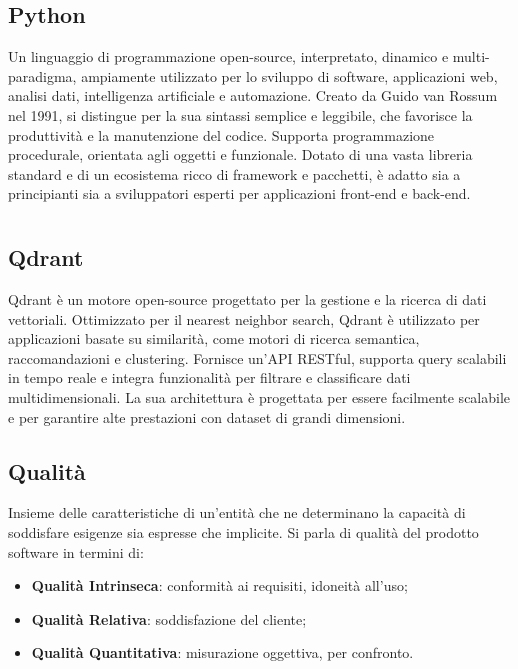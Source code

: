 \hypertarget{sec:python}{}
\subsection*{Python}
Un linguaggio di programmazione open-source, interpretato, dinamico e multi-paradigma, ampiamente utilizzato per lo sviluppo di software, applicazioni web, 
analisi dati, intelligenza artificiale e automazione. Creato da Guido van Rossum nel 1991, si distingue per la sua sintassi semplice e leggibile, che 
favorisce la produttività e la manutenzione del codice. Supporta programmazione procedurale, orientata agli oggetti e funzionale. Dotato di una vasta 
libreria standard e di un ecosistema ricco di framework e pacchetti, è adatto sia a principianti sia a sviluppatori esperti per applicazioni front-end e 
back-end.

\newpage



\section{}

\hypertarget{sec:qdrant}{}
\subsection*{Qdrant}
Qdrant è un motore open-source progettato per la gestione e la ricerca di dati vettoriali. Ottimizzato per il nearest neighbor search, Qdrant è utilizzato 
per applicazioni basate su similarità, come motori di ricerca semantica, raccomandazioni e clustering. Fornisce un'API RESTful, supporta query scalabili in 
tempo reale e integra funzionalità per filtrare e classificare dati multidimensionali. La sua architettura è progettata per essere facilmente scalabile e 
per garantire alte prestazioni con dataset di grandi dimensioni.

\hypertarget{sec:Qualità}{}
\subsection*{Qualità}
Insieme delle caratteristiche di un’entità che ne determinano la capacità di soddisfare esigenze sia espresse che implicite. Si parla di qualità del prodotto software in termini di:
\begin{itemize}
    \item \textbf{Qualità Intrinseca}: conformità ai requisiti, idoneità all’uso;
    \item \textbf{Qualità Relativa}: soddisfazione del cliente;
    \item \textbf{Qualità Quantitativa}: misurazione oggettiva, per confronto.
\end{itemize}


